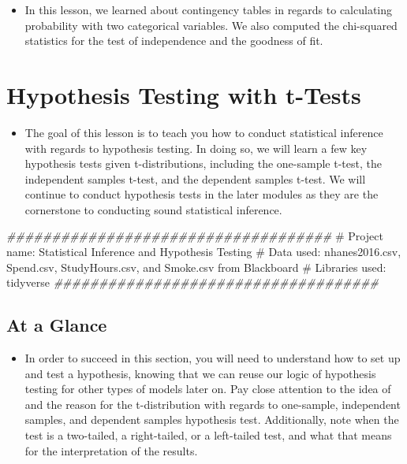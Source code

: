 \documentclass[
  letterpaper,
  DIV=11,
  numbers=noendperiod]{scrreprt}
\newenvironment{Shaded}{\begin{snugshade}}{\end{snugshade}}
\newcommand{\CommentTok}[1]{\textcolor[rgb]{0.37,0.37,0.37}{#1}}
\newcommand{\DocumentationTok}[1]{\textcolor[rgb]{0.37,0.37,0.37}{\textit{#1}}}
\providecommand{\tightlist}{%
  \setlength{\itemsep}{0pt}\setlength{\parskip}{0pt}}\usepackage{longtable,booktabs,array}
\begin{document}
\begin{itemize}
\tightlist
\item
  In this lesson, we learned about contingency tables in regards to
  calculating probability with two categorical variables. We also
  computed the chi-squared statistics for the test of independence and
  the goodness of fit.
\end{itemize}


\chapter{Hypothesis Testing with
t-Tests}\label{hypothesis-testing-with-t-tests}

\begin{itemize}
\tightlist
\item
  The goal of this lesson is to teach you how to conduct statistical
  inference with regards to hypothesis testing. In doing so, we will
  learn a few key hypothesis tests given t-distributions, including the
  one-sample t-test, the independent samples t-test, and the dependent
  samples t-test. We will continue to conduct hypothesis tests in the
  later modules as they are the cornerstone to conducting sound
  statistical inference.
\end{itemize}

\begin{Shaded}
\begin{Highlighting}[]
\DocumentationTok{\#\#\#\#\#\#\#\#\#\#\#\#\#\#\#\#\#\#\#\#\#\#\#\#\#\#\#\#\#\#\#\#\#\#\#\#}
\CommentTok{\# Project name: Statistical Inference and Hypothesis Testing}
\CommentTok{\# Data used: nhanes2016.csv, Spend.csv, StudyHours.csv, and Smoke.csv from Blackboard}
\CommentTok{\# Libraries used: tidyverse}
\DocumentationTok{\#\#\#\#\#\#\#\#\#\#\#\#\#\#\#\#\#\#\#\#\#\#\#\#\#\#\#\#\#\#\#\#\#\#\#\#}
\end{Highlighting}
\end{Shaded}

\section{At a Glance}\label{at-a-glance-5}

\begin{itemize}
\tightlist
\item
  In order to succeed in this section, you will need to understand how
  to set up and test a hypothesis, knowing that we can reuse our logic
  of hypothesis testing for other types of models later on. Pay close
  attention to the idea of and the reason for the t-distribution with
  regards to one-sample, independent samples, and dependent samples
  hypothesis test. Additionally, note when the test is a two-tailed, a
  right-tailed, or a left-tailed test, and what that means for the
  interpretation of the results.
\end{itemize}
\end{document}
